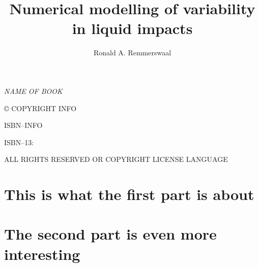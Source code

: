 \documentclass[10pt,twoside,openright]{memoir}
\author{Ronald A. Remmerswaal}
\title{Numerical modelling of variability in liquid impacts}
\date{}
\makeatletter
\def\maketitle{%
  \null
  \thispagestyle{empty}%
  \vfill
  \begin{center}\leavevmode
    {\normalfont\slshape\LARGE\raggedleft \@author\par}%
    \hrulefill\par
    {\normalfont\scshape\huge\raggedright \@title\par}%
    \vskip 1cm
  \end{center}%
  \vfill
  \null
  \cleardoublepage
  }
\makeatother
\begin{document}
  
  \maketitle

  \frontmatter
  
  {
    \tableofcontents*
    \printglossary[type=\acronymtype,style=alttree]

    \null\vfill

    \thispagestyle{simple}
    \begin{flushleft}
      \textit{NAME OF BOOK}
    
    
      © COPYRIGHT INFO
    
    
      ISBN--INFO
    
      ISBN--13:
      \bigskip
    
    
    
    
      ALL RIGHTS RESERVED OR COPYRIGHT LICENSE LANGUAGE
    
    
  
  
    \end{flushleft}
  }


  \mainmatter

  
  
  \partabstract{\itshape \lipsum[1]}
  \part{This is what the first part is about}\label{partone}
  
  \cleardoublepage

  \partabstract{\itshape \lipsum[2]}
  \part{The second part is even more interesting}\label{parttwo}
  
  

  \backmatter
  {
    \renewcommand{\UrlFont}{\normalfont\small}
    
  }
\end{document}
